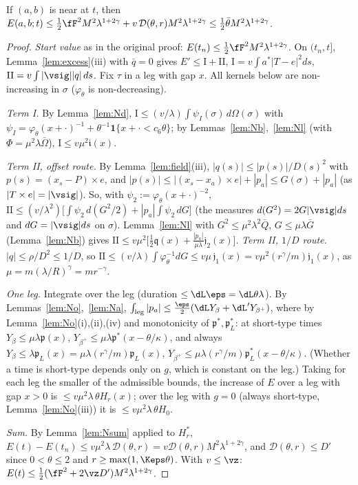 \begin{proposition}\label{prop:nearN}
If $(a,b)$ is near at $t$, then $E(a,b;t)\le\frac12\fF^2M^2\lambda^{1+2\gamma}+v\,\mathcal D(\theta,r)M^2\lambda^{1+2\gamma}
\le\frac12\bar\theta M^2\lambda^{1+2\gamma}$.
\end{proposition}
\begin{proof}
\emph{Start value} as in the original proof: $E(t_n)\le\frac12\fF^2M^2\lambda^{1+2\gamma}$. On $(t_n,t]$, Lemma~\ref{lem:excess}(iii)
with $\bar q=0$ gives $E'\le\mathrm I+\mathrm{II}$, $\mathrm I=v\int a^*|T-e|^2ds$, $\mathrm{II}=v\int|\vsig||q|\,ds$. Fix $\tau$
in a leg with gap $x$. All kernels below are non-increasing in $\sigma$ ($\varphi_\theta$ is non-decreasing).

\emph{Term I.} By Lemma~\ref{lem:Nd}, $\mathrm I\le(v/\lambda)\int\psi_I(\sigma)\,d\Omega(\sigma)$ with
$\psi_I=\varphi_\theta(x+\cdot)^{-1}+\theta^{-1}\mathbf 1\{x+\cdot<c_6\theta\}$; by Lemmas~\ref{lem:Nb},~\ref{lem:Nl} (with
$\Phi=\mu^2\lambda\bar\Omega$), $\mathrm I\le v\mu^2\mathfrak i(x)$.

\emph{Term II, offset route.} By Lemma~\ref{lem:field}(iii), $|q(s)|\le|p(s)|/D(s)^2$ with $p(s)=(x_s-P)\times e$, and
$|p(s)|\le|(x_s-x_a)\times e|+|p_a|\le G(\sigma)+|p_a|$ (as $|T\times e|=|\vsig|$). So, with $\psi_2:=\varphi_\theta(x+\cdot)^{-2}$,
$\mathrm{II}\le(v/\lambda^2)\bigl[\int\psi_2\,d(G^2/2)+|p_a|\int\psi_2\,dG\bigr]$ (the measures $d(G^2)=2G|\vsig|ds$ and
$dG=|\vsig|ds$ on $\sigma$). Lemma~\ref{lem:Nl} with $G^2\le\mu^2\lambda^2\bar Q$, $G\le\mu\lambda\bar G$ (Lemma~\ref{lem:Nb}) gives
$\mathrm{II}\le v\mu^2\bigl[\frac12\mathfrak q(x)+\frac{|p_a|}{\mu\lambda}\mathfrak j_2(x)\bigr]$.
\emph{Term II, $1/D$ route.} $|q|\le\rho/D^2\le1/D$, so $\mathrm{II}\le(v/\lambda)\int\varphi_\theta^{-1}dG\le v\mu\,\mathfrak j_1(x)
=v\mu^2(r^\gamma/m)\mathfrak j_1(x)$, as $\mu=m(\lambda/R)^\gamma=mr^{-\gamma}$.

\emph{One leg.} Integrate over the leg (duration $\le\dL\eps=\dL\theta\lambda$). By Lemmas~\ref{lem:No},~\ref{lem:Na},
$\int_{\rm leg}|p_a|\le\frac\eps2(\dL Y_\beta+\dL'Y_{\beta^+})$, where by Lemma~\ref{lem:No}(i),(ii),(iv) and monotonicity of
$\mathfrak p^*,\mathfrak p_L^*$: at short-type times $Y_\beta\le\mu\lambda\mathfrak p(x)$, $Y_{\beta^+}\le\mu\lambda\mathfrak p^*(x-\theta/\kappa)$, and
always $Y_\beta\le\lambda\mathfrak p_L(x)=\mu\lambda(r^\gamma/m)\mathfrak p_L(x)$, $Y_{\beta^+}\le\mu\lambda(r^\gamma/m)\mathfrak p_L^*(x-\theta/\kappa)$.
(Whether a time is short-type depends only on $g$, which is constant on the leg.) Taking for each leg the smaller of the admissible
bounds, the increase of $E$ over a leg with gap $x>0$ is $\le v\mu^2\lambda\,\theta H_r(x)$; over the leg with $g=0$ (always
short-type, Lemma~\ref{lem:No}(iii)) it is $\le v\mu^2\lambda\,\theta H_0$.

\emph{Sum.} By Lemma~\ref{lem:Nsum} applied to $H_r^*$, $E(t)-E(t_n)\le v\mu^2\lambda\,\mathcal D(\theta,r)=v\mathcal D(\theta,r)
M^2\lambda^{1+2\gamma}$, and $\mathcal D(\theta,r)\le D'$ since $0<\theta\le2$ and $r\ge\max(1,\Keps\theta)$. With $v\le\vz$:
$E(t)\le\frac12(\fF^2+2\vz D')M^2\lambda^{1+2\gamma}$.
\end{proof}

